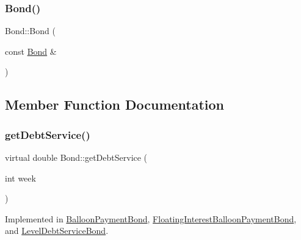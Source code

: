 \mbox{\label{classBond_acaa8874ed5e81057eeb7dc55fb6b5373}} 
\subsubsection{\texorpdfstring{Bond()}{Bond()}\hspace{0.1cm}{\footnotesize\ttfamily [4/4]}}
{\footnotesize\ttfamily Bond\+::\+Bond (\begin{DoxyParamCaption}\item[{const \mbox{\hyperlink{classBond}{Bond}} \&}]{ }\end{DoxyParamCaption})\hspace{0.3cm}{\ttfamily [default]}}



\subsection{Member Function Documentation}
\mbox{\label{classBond_a98d8ecaf4b36319674ebd220598996bc}} 
\subsubsection{\texorpdfstring{get\+Debt\+Service()}{getDebtService()}}
{\footnotesize\ttfamily virtual double Bond\+::get\+Debt\+Service (\begin{DoxyParamCaption}\item[{int}]{week }\end{DoxyParamCaption})\hspace{0.3cm}{\ttfamily [pure virtual]}}



Implemented in \mbox{\hyperlink{classBalloonPaymentBond_a8648a2ae688f90a3b2e6689711c22b9d}{Balloon\+Payment\+Bond}}, \mbox{\hyperlink{classFloatingInterestBalloonPaymentBond_a0009a0b12e0ebeb15952561513ddc901}{Floating\+Interest\+Balloon\+Payment\+Bond}}, and \mbox{\hyperlink{classLevelDebtServiceBond_adcb3bd3c34b0cbb7b013f387ddd8b7f5}{Level\+Debt\+Service\+Bond}}.

\mbox{\label{classBond_a5997278813deb16aa5d01bbca8ecc7b2}} 
